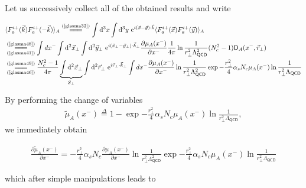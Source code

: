 \begin{note}
    Let us successively collect all of the obtained results and write
    
    \newpage
    
    \begin{fullwidth}
    \begin{align*}
        &\langle F_{a}^{i+}(\vec{k}) F_{a}^{i+}(-\vec{k})\rangle_A\stackrel{(\text{\cref{glasma32}})}{=\joinrel=\joinrel=}\int \mathrm{d}^{3} x \int \mathrm{d}^{3} y \text{  }\mathrm{e}^{i(\vec{x}-\vec{y}) \cdot \vec{k}} \langle F^{i+}_a(\vec{x})F^{i+}_a(\vec{y})\rangle_A\\
        &\underset{(\text{\cref{glasma41}})}{\stackrel{(\text{\cref{glasma48}})}{=\joinrel=\joinrel=}}\int dx^-\int \mathrm{d}^{2} \vec{x}_\perp \int \mathrm{d}^{2} \vec{y}_\perp \text{  }\mathrm{e}^{i(\vec{x}_\perp-\vec{y}_\perp) \cdot \vec{k}_\perp}\frac{\partial\mu_A(x^-)}{\partial x^-}\frac{1}{4\pi}\ln{\frac{1}{r_\perp^2\Lambda_{\textsf{QCD}}^2}}(N_c^2-1)\textsf{D}_A(x^-,\vec{r}_\perp)\\
        &\underset{(\text{\cref{glasma46}})}{\stackrel{(\text{\cref{glasma49}})}{=\joinrel=\joinrel=}}\frac{N_c^2-1}{4\pi}\underbrace{\int \mathrm{d}^{2} \vec{x}_\perp}_{S_\perp}\int \mathrm{d}^{2} \vec{r}_\perp \text{  }\mathrm{e}^{i\vec{r}_\perp \cdot \vec{k}_\perp}\int dx^-\frac{\partial\mu_A(x^-)}{\partial x^-}\ln{\frac{1}{r_\perp^2\Lambda_{\textsf{QCD}}^2}}\exp{-\frac{r_\perp^2}{4}\alpha_sN_c\mu_A(x^-)\ln{\frac{1}{r_\perp^2\Lambda_{\textsf{QCD}}}}}
    \end{align*}
    \end{fullwidth}
    By performing the change of variables
    \begin{align*}
        \widetilde{\mu}_A(x^-)\overset{\Delta}{=}1-\exp{-\frac{r_\perp^2}{4}\alpha_sN_c\mu_A(x^-)\ln{\frac{1}{r_\perp^2\Lambda_{\textsf{QCD}}}}},
    \end{align*}
    we immediately obtain
    \begin{fullwidth}
    \begin{align*}
        \frac{\partial\widetilde{\mu}_A(x^-)}{\partial x^-}=-\frac{r_\perp^2}{4}\alpha_sN_c\frac{\partial\mu_A(x^-)}{\partial x^-}\ln{\frac{1}{r_\perp^2\Lambda_{\textsf{QCD}}^2}}\exp{-\frac{r_\perp^2}{4}\alpha_sN_c\mu_A(x^-)\ln{\frac{1}{r_\perp^2\Lambda_{\textsf{QCD}}}}}
    \end{align*}
    \end{fullwidth}
    which after simple manipulations leads to
    \begin{fullwidth}

\end{fullwidth}
\end{note}
